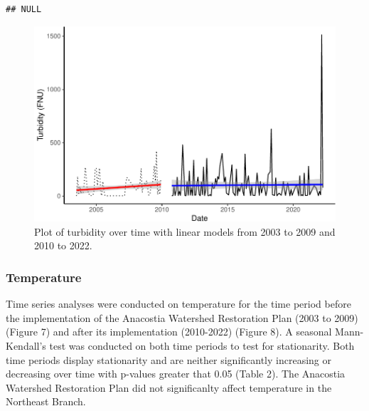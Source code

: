 \documentclass[
  12pt,
]{article}
\begin{document}
\begin{verbatim}
## NULL
\end{verbatim}

\newpage

\begin{figure}

{\centering \includegraphics{Project_Template_files/figure-latex/Plot of Turbidity over time with LMs-1} 

}

\caption{Plot of turbidity over time with linear models from 2003 to 2009 and 2010 to 2022.}\label{fig:Plot of Turbidity over time with LMs}
\end{figure}

\newpage

\hypertarget{temperature}{%
\subsubsection{Temperature}\label{temperature}}

Time series analyses were conducted on temperature for the time period
before the implementation of the Anacostia Watershed Restoration Plan
(2003 to 2009) (Figure 7) and after its implementation (2010-2022)
(Figure 8). A seasonal Mann-Kendall's test was conducted on both time
periods to test for stationarity. Both time periods display stationarity
and are neither significantly increasing or decreasing over time with
p-values greater that 0.05 (Table 2). The Anacostia Watershed
Restoration Plan did not significanlty affect temperature in the
Northeast Branch.
\end{document}
